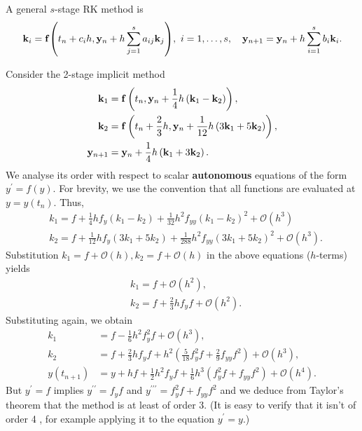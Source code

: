 \documentclass[a4paper]{article}
\begin{document}
\begin{method}
    A general $s$-stage RK method is 
    \[
        \mathbf{k}_i = \mathbf{f}\qty(t_n + c_i h, \mathbf{y}_n + h \sum_{j=1}^{s}a_{ij}\mathbf{k}_j),\ i = 1, \dots, s,\quad \mathbf{y}_{n+1} = \mathbf{y}_n + h \sum_{i=1}^{s}b_i \mathbf{k}_i. 
    \]
\end{method}
\begin{example}\label{eg:9.5}
Consider the 2-stage implicit method
\[
\begin{aligned}
{\bf k}_1 & ={\bf f}\left(t_n, \mathbf{y}_n+\frac{1}{4} h\left(\mathbf{k}_1-\mathbf{k}_2\right)\right), \\
\mathbf{k}_2 & ={\bf f}\left(t_n+\frac{2}{3} h, \mathbf{y}_n+\frac{1}{12} h\left(3 \mathbf{k}_1+5 \mathbf{k}_2\right)\right), \\
\mathbf{y}_{n+1} & =\mathbf{y}_n+\frac{1}{4} h\left(\mathbf{k}_1+3 \mathbf{k}_2\right) .
\end{aligned}
\]
We analyse its order with respect to scalar \textbf{autonomous} equations of the form $y^{\prime}=f(y)$. For brevity, we use the convention that all functions are evaluated at $y=y\left(t_n\right)$. Thus,
\[
\begin{aligned}
& k_1=f+\frac{1}{4} h f_y\left(k_1-k_2\right)+\frac{1}{32} h^2 f_{y y}\left(k_1-k_2\right)^2+\mathcal{O}\left(h^3\right) \\
& k_2=f+\frac{1}{12} h f_y\left(3 k_1+5 k_2\right)+\frac{1}{288} h^2 f_{y y}\left(3 k_1+5 k_2\right)^2+\mathcal{O}\left(h^3\right) .
\end{aligned}
\]
Substitution $k_1=f+\mathcal{O}(h), k_2=f+\mathcal{O}(h)$ in the above equations ($h$-terms) yields
\[
\begin{aligned}
& k_1=f+\mathcal{O}\left(h^2\right), \\
& k_2=f+\frac{2}{3} h f_y f+\mathcal{O}\left(h^2\right) .
\end{aligned}
\]
Substituting again, we obtain
\[
\begin{aligned}
k_1 & =f-\frac{1}{6} h^2 f_y^2 f+\mathcal{O}\left(h^3\right), \\
k_2 & =f+\frac{2}{3} h f_y f+h^2\left(\frac{5}{18} f_y^2 f+\frac{2}{9} f_{y y} f^2\right)+\mathcal{O}\left(h^3\right), \\
y\left(t_{n+1}\right) & =y+h f+\frac{1}{2} h^2 f_y f+\frac{1}{6} h^3\left(f_y^2 f+f_{y y} f^2\right)+\mathcal{O}\left(h^4\right) .
\end{aligned}
\]
But $y^{\prime}=f$ implies $y^{\prime \prime}=f_y f$ and $y^{\prime \prime \prime}=f_y^2 f+f_{y y} f^2$ and we deduce from Taylor's theorem that the method is at least of order 3. (It is easy to verify that it isn't of order 4 , for example applying it to the equation $y^{\prime}=y$.)
\end{example}
\end{document}
